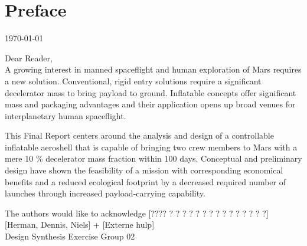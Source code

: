 \section*{Preface}\label{cha:preface}

\begin{flushright}
	\today
\end{flushright}

Dear Reader,	
\\ [1cm]
A growing interest in manned spaceflight and human exploration of Mars requires a new solution. Conventional, rigid entry solutions require a significant decelerator mass to bring payload to ground. Inflatable concepts offer significant mass and packaging advantages and their application opens up broad venues for interplanetary human spaceflight. 

This Final Report centers around the analysis and design of a controllable inflatable aeroshell that is capable of bringing two crew members to Mars with a mere 10 \% decelerator mass fraction within 100 days. Conceptual and preliminary design have shown the feasibility of a mission with corresponding economical benefits and a reduced ecological footprint by a decreased required number of launches through increased payload-carrying capability.

The authors would like to acknowledge  [???? ? ? ? ? ? ? ? ? ? ? ? ? ? ? ?] [Herman, Dennis, Niels] + [Externe hulp]
\\ [1.5cm]
Design Synthesis Exercise Group 02
